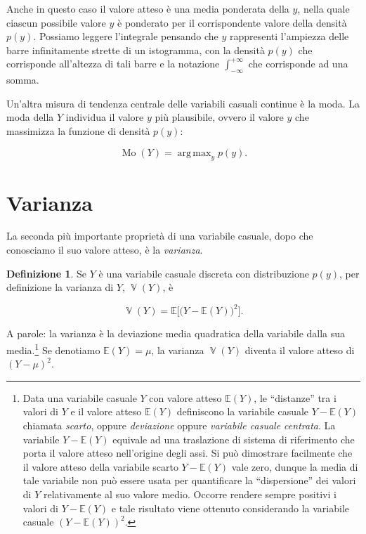 \documentclass[
  11pt,
]{krantz}
\newcommand{\E}{\mathbb{E}} %
\DeclareMathOperator{\Var}{\mathbb{V}} %
\DeclareMathOperator{\Mo}{Mo} %
\DeclareMathOperator{\argmax}{arg\,max} %
\theoremstyle{definition}
\newtheorem{definition}{Definizione}[chapter]
\theoremstyle{definition}
\theoremstyle{definition}
\theoremstyle{definition}
\theoremstyle{remark}
\begin{document}
Anche in questo caso il valore atteso è una media ponderata della \(y\), nella quale ciascun possibile valore \(y\) è ponderato per il corrispondente valore della densità \(p(y)\). Possiamo leggere l'integrale pensando che \(y\) rappresenti l'ampiezza delle barre infinitamente strette di un istogramma, con la densità \(p(y)\) che corrisponde all'altezza di tali barre e la notazione \(\int_{-\infty}^{+\infty}\) che corrisponde ad una somma.

Un'altra misura di tendenza centrale delle variabili casuali continue è la moda. La moda della \(Y\) individua il valore \(y\) più plausibile, ovvero il valore \(y\) che massimizza la funzione di densità \(p(y)\):

\begin{equation}
\Mo(Y) = \argmax_y p(y).
\label{eq:def-mode}
\end{equation}

\hypertarget{varianza}{%
\section{Varianza}\label{varianza}}

La seconda più importante proprietà di una variabile casuale, dopo che conosciamo il suo valore atteso, è la \emph{varianza}.

\begin{definition}
Se \(Y\) è una variabile casuale discreta con distribuzione \(p(y)\), per definizione la varianza di \(Y\), \(\Var(Y)\), è

\begin{equation}
\Var(Y) = \E\Big[\big(Y - \E(Y)\big)^2\Big].
\label{eq:def-var-rv}
\end{equation}
\end{definition}

A parole: la varianza è la deviazione media quadratica della variabile dalla sua media.\footnote{Data una variabile casuale \(Y\) con valore atteso \(\E(Y)\), le ``distanze'' tra i valori di \(Y\) e il valore atteso \(\E(Y)\) definiscono la variabile casuale \(Y - \E(Y)\) chiamata \emph{scarto}, oppure \emph{deviazione} oppure \emph{variabile casuale centrata}. La variabile \(Y - \E(Y)\) equivale ad una traslazione di sistema di riferimento che porta il valore atteso nell'origine degli assi. Si può dimostrare facilmente che il valore atteso della variabile scarto \(Y - \E(Y)\) vale zero, dunque la media di tale variabile non può essere usata per quantificare la ``dispersione'' dei valori di \(Y\) relativamente al suo valore medio. Occorre rendere sempre positivi i valori di \(Y - \E(Y)\) e tale risultato viene ottenuto considerando la variabile casuale \(\left(Y - \E(Y)\right)^2\).} Se denotiamo \(\E(Y) = \mu\), la varianza \(\Var(Y)\) diventa il valore atteso di \((Y - \mu)^2\).
\end{document}
